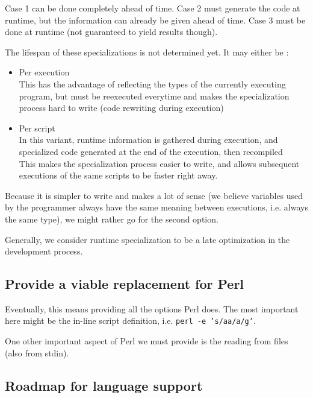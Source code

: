 \documentclass[11pt,a4paper]{article}
\newcommand{\pgl}[1]{\textsf{#1}}
\newcommand{\bash}[1]{\texttt{#1}}
\begin{document}
Case 1 can be done completely ahead of time. Case 2 must generate the code at runtime, but the information can already be given ahead of time. Case 3 must be done at runtime (not guaranteed to yield results though).

The lifespan of these specializations is not determined yet. It may either be :
\begin{itemize}
\item Per execution \\
This has the advantage of reflecting the types of the currently executing program, but must be reexecuted everytime and makes the specialization process hard to write (code rewriting during execution)
\item Per script \\
In this variant, runtime information is gathered during execution, and specialized code generated at the end of the execution, then recompiled\\
This makes the specialization process easier to write, and allows subsequent executions of the same scripts to be faster right away.
\end{itemize}

Because it is simpler to write and makes a lot of sense (we believe variables used by the programmer always have the same meaning between executions, i.e. always the same type), we might rather go for the second option.

Generally, we consider runtime specialization to be a late optimization in the development process.

\subsection{Provide a viable replacement for Perl}

Eventually, this means providing all the options \pgl{Perl} does. The most important here might be the in-line script definition, i.e. \bash{perl -e 's/aa/a/g'}.

One other important aspect of \pgl{Perl} we must provide is the reading from files (also from stdin).

\subsection{Roadmap for language support}
\end{document}
